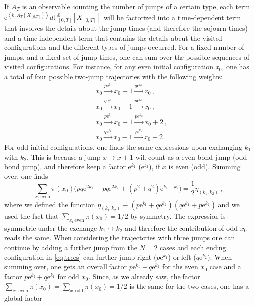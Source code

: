 \documentclass[a4paper,11pt]{article}
\numberwithin{equation}{section}
\begin{document}
If $A_T$ is an observable counting the number of jumps of a certain type, each term $\mathrm{e}^{\left\langle k, A_T (X_{[0,T]}) \right\rangle} d \mathbb{P}_{[0,T]}^0 [X_{[0,T]}]$ will be factorized into a time-dependent term that involves the details about the jump times (and therefore the sojourn times) and a time-independent term that contains the details about the visited configurations and the different types of jumps occurred. For a fixed number of jumps, and a fixed set of jump times, one can sum over the possible sequences of visited configurations. For instance, for any even initial configuration $x_0$, one has a total of four possible two-jump trajectories with the following weights:
\begin{align}\label{eq:trees}
    &x_0  \overset{p \mathrm{e}^{k_1}}{\longrightarrow} x_0  + 1 \overset{q \mathrm{e}^{k_1}}{\longrightarrow} x_0 \,,\\
    &x_0  \overset{q \mathrm{e}^{k_2}}{\longrightarrow} x_0  - 1 \overset{p \mathrm{e}^{k_2}}{\longrightarrow} x_0 \,,\\
    &x_0  \overset{p \mathrm{e}^{k_1}}{\longrightarrow} x_0  + 1 \overset{p \mathrm{e}^{k_2}}{\longrightarrow} x_0 + 2 \,,\\
    &x_0  \overset{q \mathrm{e}^{k_2}}{\longrightarrow} x_0  - 1 \overset{q \mathrm{e}^{k_1}}{\longrightarrow} x_0 -2  \,.
\end{align}
For odd initial configurations, one finds the same expressions upon exchanging $k_1$ with $k_2$. This is because a jump $x \to x+1$ will count as a even-bond jump (odd-bond jump), and therefore keep a factor $\mathrm{e}^{k_1}$ ($\mathrm{e}^{k_2}$), if $x$ is even (odd). Summing over, one finds 
\begin{equation*}
   \sum_{x_0 \,\text{even}} \pi(x_0) \Big( pq \mathrm{e}^{2 k_1} + pq \mathrm{e}^{2 k_2} + (p^2 + q^2)\mathrm{e}^{k_1+k_2} \Big) = \frac{1}{2} \eta_{(k_1,k_2)} \;,
\end{equation*}
where we defined the function $\eta_{(k_1,k_2)} \equiv (p \mathrm{e}^{k_1} + q \mathrm{e}^{k_2})(q \mathrm{e}^{k_1} + p \mathrm{e}^{k_2})$ and we used the fact that $\sum_{x_0 \,\text{even}} \pi(x_0)=1/2$ by symmetry. The expression is symmetric under the exchange $k_1 \leftrightarrow k_2$ and therefore the contribution of odd $x_0$ reads the same. When considering the trajectories with three jumps one can continue by adding a further jump from the $N=2$ cases and each ending configuration in \eqref{eq:trees} can further jump right ($p\mathrm{e}^{k_1}$)  or left ($q\mathrm{e}^{k_2}$). When summing over, one gets an overall factor $p\mathrm{e}^{k_1} + q\mathrm{e}^{k_2}$ for the even $x_0$ case and a factor $p\mathrm{e}^{k_2} + q\mathrm{e}^{k_1}$ for odd $x_0$. Since, as we already saw, the factor $\sum_{x_0 \,\text{even}} \pi(x_0) = \sum_{x_0 \,\text{odd}} \pi(x_0)= 1/2$ is the same for the two cases, one has a global factor
\end{document}
